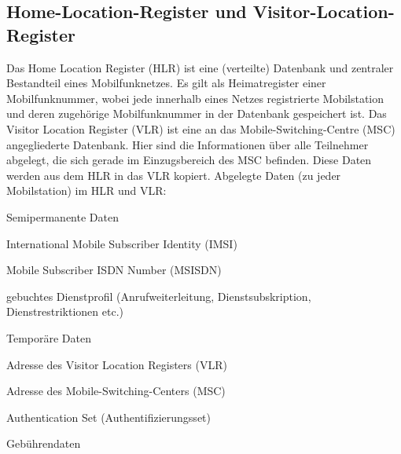 \documentclass[loesung]{schulein}
\begin{document}
\subsection*{Home-Location-Register und Visitor-Location-Register}
Das Home Location Register (HLR) ist eine (verteilte) Datenbank und zentraler Bestandteil eines Mobilfunknetzes. Es gilt als Heimatregister einer Mobilfunknummer, wobei jede innerhalb eines Netzes registrierte Mobilstation und deren zugehörige Mobilfunknummer in der Datenbank gespeichert ist. 
Das Visitor Location Register (VLR) ist eine  an das Mobile-Switching-Centre (MSC) angegliederte Datenbank. Hier sind die Informationen über alle Teilnehmer abgelegt, die sich gerade im Einzugsbereich des MSC befinden. Diese Daten werden aus dem HLR in das VLR kopiert.
Abgelegte Daten (zu jeder Mobilstation) im HLR und VLR:
\begin{smallitemize}
\item Semipermanente Daten
\begin{smallitemize}
\item International Mobile Subscriber Identity (IMSI)
\item Mobile Subscriber ISDN Number (MSISDN)
\item gebuchtes Dienstprofil (Anrufweiterleitung, Dienstsubskription, Dienstrestriktionen etc.)
\end{smallitemize}
\item Temporäre Daten
\begin{smallitemize}
\item Adresse des Visitor Location Registers (VLR)
\item Adresse des Mobile-Switching-Centers (MSC)
\item Authentication Set (Authentifizierungsset)
\item Gebührendaten
\end{smallitemize}
\end{smallitemize}
\end{document}
